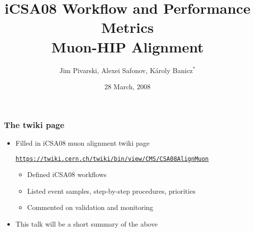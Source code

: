 \documentclass[compress]{beamer}
\title{iCSA08 Workflow and Performance Metrics \\ Muon-HIP Alignment}
\author{Jim Pivarski, Alexei Safonov, K\'aroly Banicz$^*$}
\institute{Texas A\&M University, $^*$FermiLab}
\date{28 March, 2008}
\begin{document}
\frame{\titlepage}


\begin{frame}
\frametitle{The twiki page}

\begin{itemize}\setlength{\itemsep}{0.75 cm}
\item Filled in iCSA08 muon alignment twiki page

\textcolor{blue}{\tt \small \underline{\href{https://twiki.cern.ch/twiki/bin/view/CMS/CSA08AlignMuon}{https://twiki.cern.ch/twiki/bin/view/CMS/CSA08AlignMuon}}}

\vspace{0.25 cm}
\begin{itemize}\setlength{\itemsep}{0.5 cm}
\item Defined iCSA08 workflows

\item Listed event samples, step-by-step procedures, priorities

\item Commented on validation and monitoring
\end{itemize}

\item This talk will be a short summary of the above
\end{itemize}
\end{frame}
\end{document}
